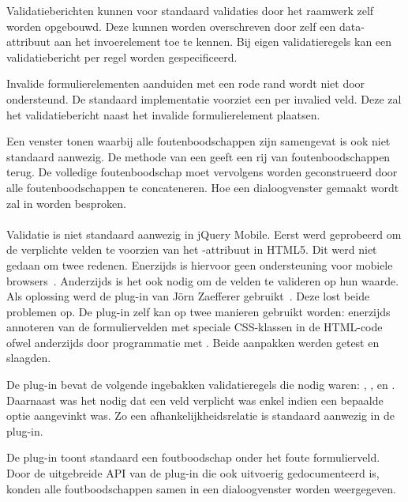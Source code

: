 
Validatieberichten kunnen voor standaard validaties door het raamwerk zelf worden opgebouwd.
Deze kunnen worden overschreven door zelf een data-attribuut  aan het invoerelement toe te kennen.
Bij eigen validatieregels kan een validatiebericht per regel worden gespecificeerd.

Invalide formulierelementen aanduiden met een rode rand wordt niet door \kendo{} ondersteund.
De standaard implementatie voorziet een  per invalied veld.
Deze zal het validatiebericht naast het invalide formulierelement plaatsen. 

Een venster tonen waarbij alle foutenboodschappen zijn samengevat is ook niet standaard aanwezig.
De  methode van een  geeft een rij van foutenboodschappen terug.
De volledige foutenboodschap moet vervolgens worden geconstrueerd door alle foutenboodschappen te concateneren.
Hoe een dialoogvenster gemaakt wordt zal in  worden besproken.

\paragraph{\jqm}
Validatie is niet standaard aanwezig in jQuery Mobile. 
Eerst werd geprobeerd om de verplichte velden te voorzien van het -attribuut in HTML5. 
Dit werd niet gedaan om twee redenen.
Enerzijds is hiervoor geen ondersteuning voor mobiele browsers~\cite{Deveria2013}. 
Anderzijds is het ook nodig om de velden te valideren op hun waarde.
Als oplossing werd de plug-in van Jörn Zaefferer gebruikt~\cite{Zaefferer2013}. 
Deze lost beide problemen op.
De plug-in zelf kan op twee manieren gebruikt worden: enerzijds annoteren van de formuliervelden met speciale CSS-klassen in de HTML-code ofwel anderzijds door programmatie met \js{}. 
Beide aanpakken werden getest en slaagden. 

De plug-in bevat de volgende ingebakken validatieregels die nodig waren: , ,  en .
Daarnaast was het nodig dat een veld verplicht was enkel indien een bepaalde optie aangevinkt was.
Zo een afhankelijkheidsrelatie is standaard aanwezig in de plug-in.

De plug-in toont standaard een foutboodschap onder het foute formulierveld.
Door de uitgebreide API van de plug-in die ook uitvoerig gedocumenteerd is, konden alle foutboodschappen samen in een dialoogvenster worden weergegeven.

